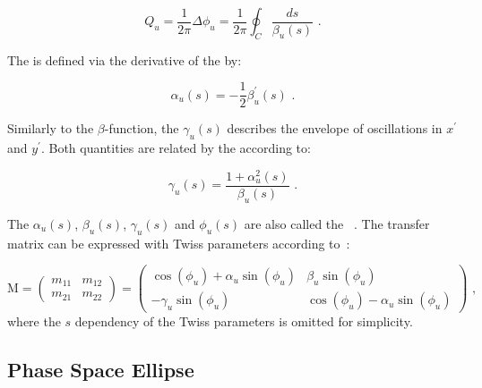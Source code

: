 \begin{equation}
    Q_{u} = \frac{1}{2 \pi} \Delta \phi_{u} = \frac{1}{2 \pi} \oint_C \dfrac{ds}{\beta_{u} (s)} \text{ .}
    \label{equation:tune_definition}
\end{equation}

The \alphafunction is defined via the derivative of the \betafunction by:

\begin{equation}
    \alpha_u(s) = - \frac{1}{2} \beta^{\prime}_u(s) \text{ .}
    \label{equation:alpha_function}
\end{equation}

Similarly to the \(\beta\)-function, the  \(\gamma_u(s)\) describes the envelope of oscillations in \(x^{\prime}\) and \(y^{\prime}\).
Both quantities are related by the \alphafunction according to:

\begin{equation}
    \gamma_u(s) = \frac{1 + \alpha_u^2(s)}{\beta_u(s)} \text{ .}
    \label{equation:gamma_function}
\end{equation}

The \(\alpha_u (s)\), \(\beta_u (s)\), \(\gamma_u (s)\) and \(\phi_u (s)\) are also called the ~\cite{RSI:Twiss:Orbital_Stability_Proton_Synchrotron}.
The transfer matrix can be expressed with Twiss parameters according to~\cite{AOP:COURANT:Theory_Alternating_Gradient_Synchrotron}:

\begin{equation}
    \mathrm{M} = 
    \left( 
    \begin{array}{ll}
        m_{11} & m_{12} \\
        m_{21} & m_{22}
    \end{array} \right) 
    = 
    \left(
    \begin{array}{cc}
        \cos(\phi_u) + \alpha_u \sin(\phi_u) & \beta_u \sin(\phi_u) \\
        - \gamma_u \sin(\phi_u)              & \cos(\phi_u) - \alpha_u \sin(\phi_u)
    \end{array} 
    \right) \text{ ,}
    \label{equation:transfer_matrix_twiss_parameters}
\end{equation}
where the \(s\) dependency of the Twiss parameters is omitted for simplicity.

\subsection{Phase Space Ellipse}
\label{subsection:phase_space_ellipse}

